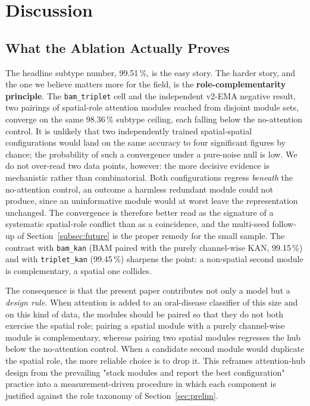 \section{Discussion}\label{sec:discussion}

\subsection{What the Ablation Actually Proves}\label{subsec:what_ablation_proves}

The headline subtype number, 99.51\,\%, is the easy story. The harder
story, and the one we believe matters more for the field, is the
\textbf{role-complementarity principle}. The \texttt{bam\_triplet} cell and the
independent v2-EMA negative result, two pairings of spatial-role attention
modules reached from disjoint module sets, converge on the same 98.36\,\%
subtype ceiling, each falling below the no-attention control. It is unlikely
that two independently trained spatial-spatial configurations would land on the
same accuracy to four significant figures by chance; the probability of such a
convergence under a pure-noise null is low. We do not over-read two data points,
however: the more decisive evidence is mechanistic rather than combinatorial.
Both configurations regress \emph{beneath} the no-attention control, an
outcome a harmless redundant module could not produce, since an uninformative
module would at worst leave the representation unchanged. The convergence is
therefore better read as the signature of a systematic spatial-role conflict
than as a coincidence, and the multi-seed follow-up of
Section~\ref{subsec:future} is the proper remedy for the small sample. The
contrast with \texttt{bam\_kan} (BAM paired with the purely channel-wise KAN,
99.15\,\%) and with \texttt{triplet\_kan} (99.45\,\%) sharpens the point: a
non-spatial second module is complementary, a spatial one collides.

The consequence is that the present paper contributes not only a model but a
\emph{design rule}. When attention is added to an oral-disease classifier of
this size and on this kind of data, the modules should be paired so that they do
not both exercise the spatial role; pairing a spatial module with a purely
channel-wise module is complementary, whereas pairing two spatial modules
regresses the hub below the no-attention control. When a candidate second module
would duplicate the spatial role, the more reliable choice is to drop it. This
reframes attention-hub design from the prevailing "stack modules and report the
best configuration" practice into a measurement-driven procedure in which each
component is justified against the role taxonomy of Section~\ref{sec:prelim}.

